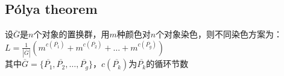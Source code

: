     \subsection*{Pólya theorem}
        设$ \overline{G} $是$ n $个对象的置换群，用$ m $种颜色对$ n $个对象染色，则不同染色方案为：
        \\$ L = \frac{1}{\left| \overline{G} \right|} (m^{c(\overline{P_1})} + m^{c(\overline{P_2})} + \dots + m^{c(\overline{P_g})}) $
        \\其中$ \overline{G} = \lbrace \overline{P_1}, \overline{P_2}, \dots, \overline{P_g} \rbrace $，$ c(\overline{P_k}) $为$ \overline{P_k} $的循环节数
